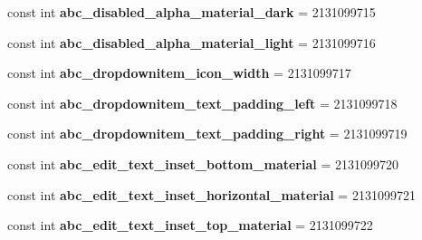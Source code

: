 \begin{DoxyCompactItemize}
\item 
\hypertarget{classClient_1_1Droid_1_1Resource_1_1Dimension_ade242bf69f732cb25a07e36fba30b986}{}const int {\bfseries abc\+\_\+disabled\+\_\+alpha\+\_\+material\+\_\+dark} = 2131099715\label{classClient_1_1Droid_1_1Resource_1_1Dimension_ade242bf69f732cb25a07e36fba30b986}

\item 
\hypertarget{classClient_1_1Droid_1_1Resource_1_1Dimension_a711e6a04425abf21fafaeaad0c5eb0a5}{}const int {\bfseries abc\+\_\+disabled\+\_\+alpha\+\_\+material\+\_\+light} = 2131099716\label{classClient_1_1Droid_1_1Resource_1_1Dimension_a711e6a04425abf21fafaeaad0c5eb0a5}

\item 
\hypertarget{classClient_1_1Droid_1_1Resource_1_1Dimension_a7d285d97cbf75d097988981a7fc30f58}{}const int {\bfseries abc\+\_\+dropdownitem\+\_\+icon\+\_\+width} = 2131099717\label{classClient_1_1Droid_1_1Resource_1_1Dimension_a7d285d97cbf75d097988981a7fc30f58}

\item 
\hypertarget{classClient_1_1Droid_1_1Resource_1_1Dimension_ab033a59765257cb4f4be1bbfa0ab6820}{}const int {\bfseries abc\+\_\+dropdownitem\+\_\+text\+\_\+padding\+\_\+left} = 2131099718\label{classClient_1_1Droid_1_1Resource_1_1Dimension_ab033a59765257cb4f4be1bbfa0ab6820}

\item 
\hypertarget{classClient_1_1Droid_1_1Resource_1_1Dimension_ab2356b4cdd3d02a92704cc121de9c697}{}const int {\bfseries abc\+\_\+dropdownitem\+\_\+text\+\_\+padding\+\_\+right} = 2131099719\label{classClient_1_1Droid_1_1Resource_1_1Dimension_ab2356b4cdd3d02a92704cc121de9c697}

\item 
\hypertarget{classClient_1_1Droid_1_1Resource_1_1Dimension_a896c6dd321a8f4a0aa384a417a2eea99}{}const int {\bfseries abc\+\_\+edit\+\_\+text\+\_\+inset\+\_\+bottom\+\_\+material} = 2131099720\label{classClient_1_1Droid_1_1Resource_1_1Dimension_a896c6dd321a8f4a0aa384a417a2eea99}

\item 
\hypertarget{classClient_1_1Droid_1_1Resource_1_1Dimension_ad93145c43eea5982beb7bf6c92d4371b}{}const int {\bfseries abc\+\_\+edit\+\_\+text\+\_\+inset\+\_\+horizontal\+\_\+material} = 2131099721\label{classClient_1_1Droid_1_1Resource_1_1Dimension_ad93145c43eea5982beb7bf6c92d4371b}

\item 
\hypertarget{classClient_1_1Droid_1_1Resource_1_1Dimension_a08635439acd748ba96e3e0b99e72ec49}{}const int {\bfseries abc\+\_\+edit\+\_\+text\+\_\+inset\+\_\+top\+\_\+material} = 2131099722\label{classClient_1_1Droid_1_1Resource_1_1Dimension_a08635439acd748ba96e3e0b99e72ec49}


\end{DoxyCompactItemize}
